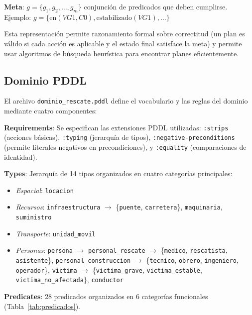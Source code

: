 \documentclass[conference]{IEEEtran}
\begin{document}
    \textbf{Meta}: $g = \{g_1, g_2, \ldots, g_m\}$ conjunción de predicados que deben cumplirse. Ejemplo: $g = \{\text{en}(VG1, C0), \text{estabilizado}(VG1), \ldots\}$

    Esta representación permite razonamiento formal sobre correctitud (un plan es válido si cada acción es aplicable y el estado final satisface la meta) y permite usar algoritmos de búsqueda heurística para encontrar planes eficientemente.

    \subsection{Dominio PDDL}

    El archivo \texttt{dominio\_rescate.pddl} define el vocabulario y las reglas del dominio mediante cuatro componentes:

    \textbf{Requirements}: Se especifican las extensiones PDDL utilizadas: \texttt{:strips} (acciones básicas), \texttt{:typing} (jerarquía de tipos), \texttt{:negative-preconditions} (permite literales negativos en precondiciones), y \texttt{:equality} (comparaciones de identidad).

    \textbf{Types}: Jerarquía de 14 tipos organizados en cuatro categorías principales:
    \begin{itemize}[leftmargin=*,itemsep=1pt]
    \item \textit{Espacial}: \texttt{locacion}
    \item \textit{Recursos}: \texttt{infraestructura} $\to$ \{\texttt{puente}, \texttt{carretera}\}, \texttt{maquinaria}, \texttt{suministro}
    \item \textit{Transporte}: \texttt{unidad\_movil}
    \item \textit{Personas}: \texttt{persona} $\to$ \texttt{personal\_rescate} $\to$ \{\texttt{medico}, \texttt{rescatista}, \texttt{asistente}\}, \texttt{personal\_construccion} $\to$ \{\texttt{tecnico}, \texttt{obrero}, \texttt{ingeniero}, \texttt{operador}\}, \texttt{victima} $\to$ \{\texttt{victima\_grave}, \texttt{victima\_estable}, \texttt{victima\_no\_afectada}\}, \texttt{conductor}
    \end{itemize}

    \textbf{Predicates}: 28 predicados organizados en 6 categorías funcionales (Tabla~\ref{tab:predicados}).
\end{document}
